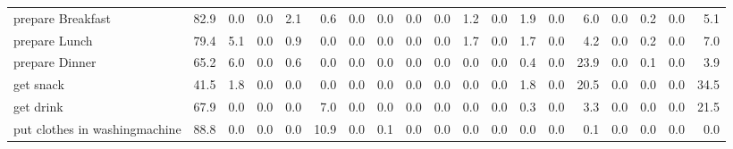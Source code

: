 \documentclass{article}
\begin{document}
\begin{sideways}
\begin{tabular}{lrrrrrrrrrrrrrrrrrr}
prepare Breakfast             &        82.9 &                0.0 &           0.0 &                          2.1 &                0.6 &                0.0 &                        0.0 &          0.0 &              0.0 &                1.2 &                    0.0 &                      1.9 &                  0.0 &                   6.0 &              0.0 &              0.2 &                                  0.0 &          5.1 \\
prepare Lunch                 &        79.4 &                5.1 &           0.0 &                          0.9 &                0.0 &                0.0 &                        0.0 &          0.0 &              0.0 &                1.7 &                    0.0 &                      1.7 &                  0.0 &                   4.2 &              0.0 &              0.2 &                                  0.0 &          7.0 \\
prepare Dinner                &        65.2 &                6.0 &           0.0 &                          0.6 &                0.0 &                0.0 &                        0.0 &          0.0 &              0.0 &                0.0 &                    0.0 &                      0.4 &                  0.0 &                  23.9 &              0.0 &              0.1 &                                  0.0 &          3.9 \\
get snack                     &        41.5 &                1.8 &           0.0 &                          0.0 &                0.0 &                0.0 &                        0.0 &          0.0 &              0.0 &                0.0 &                    0.0 &                      1.8 &                  0.0 &                  20.5 &              0.0 &              0.0 &                                  0.0 &         34.5 \\
get drink                     &        67.9 &                0.0 &           0.0 &                          0.0 &                7.0 &                0.0 &                        0.0 &          0.0 &              0.0 &                0.0 &                    0.0 &                      0.3 &                  0.0 &                   3.3 &              0.0 &              0.0 &                                  0.0 &         21.5 \\
put clothes in washingmachine &        88.8 &                0.0 &           0.0 &                          0.0 &               10.9 &                0.0 &                        0.1 &          0.0 &              0.0 &                0.0 &                    0.0 &                      0.0 &                  0.0 &                   0.1 &              0.0 &              0.0 &                                  0.0 &          0.0 \\

\end{tabular}
\end{sideways}
\end{document}
